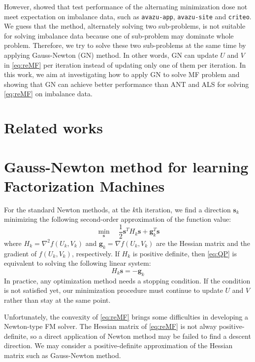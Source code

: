 \documentclass[11pt,twoside]{article}
\newcommand{\bsym}[1]{\ensuremath{\boldsymbol{#1}}}
\newcommand{\bs}{\ensuremath{\bsym{s}}}
\newcommand{\bg}{\ensuremath{\bsym{g}}}
\begin{document}
However, \citet{test17a} showed that test performance of the alternating minimization dose not meet expectation on imbalance data, such as {\tt avazu-app}, {\tt avazu-site} and {\tt criteo}. We guess that the method, alternately solving two sub-problems, is not suitable for solving imbalance data because one of sub-problem may dominate whole problem. Therefore, we try to solve these two sub-problems at the same time by applying Gauss-Newton (GN) method. In other words, GN can update $U$ and $V$ in \eqref{eq:reMF} per iteration instead of updating only one of them per iteration. In this work, 
we aim at investigating how to apply GN to solve MF problem and showing that GN can achieve better performance than ANT and ALS for solving \eqref{eq:reMF} on imbalance data.

\section{Related works}
\section{Gauss-Newton method for learning Factorization Machines}
For the standard Newton methods, at the $k$th iteration, we find a direction $\bs_k$ minimizing the following second-order approximation of the function value:
\begin{equation}
    \min_{\bs} \quad \frac{1}{2}\bs^T H_k \bs + \bg_k^T \bs
\label{eq:QP}
\end{equation}
where $H_k = \nabla^2 f(U_k, V_k)$ and $\bg_k = \nabla f(U_k, V_k)$ are the Hessian matrix and the gradient of $f(U_k, V_k)$, respectively.
If $H_k$ is positive definite, then \eqref{eq:QP} is equivalent to solving the following linear system:
\begin{equation}
    H_k\bs = -\bg_k
\label{eq:HLE}
\end{equation}
In practice, any optimization method needs a stopping condition.
If the condition is not satisfied yet, our minimization procedure must continue to update $U$ and $V$ rather than stay at the same point.


Unfortunately, the convexity of \eqref{eq:reMF} brings some difficulties in developing a Newton-type FM solver.
The Hessian matrix of \eqref{eq:reMF}  is not alway positive-definite, so a direct application of Newton method may be failed to find a descent direction.
We may consider a positive-definite approximation of the Hessian matrix such as Gauss-Newton method. 
\end{document}
